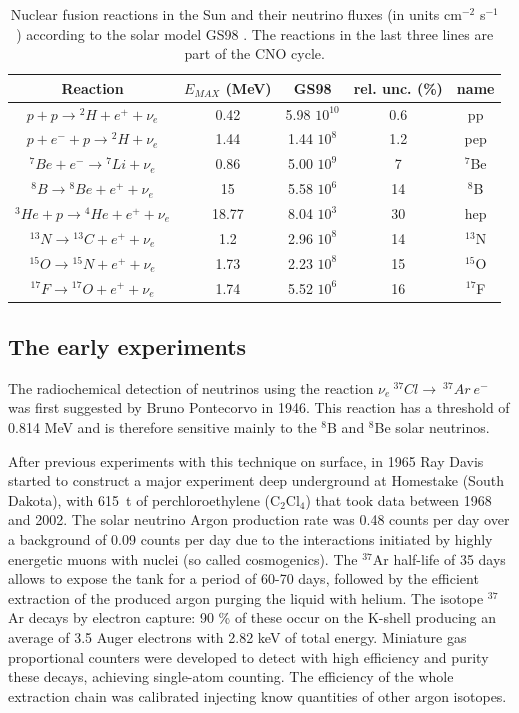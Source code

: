\begin{table}
\caption{Nuclear fusion reactions in the Sun and their neutrino fluxes (in units cm$^{-2}$ s$^{-1}$) according to the solar model GS98 \cite{serenelli}. The reactions in the last three lines are part of the CNO cycle.}
\centering
\begin{tabular}{|c|c|c|c|c|}
  \hline
  Reaction & $E_{MAX}$ (MeV) & GS98 & rel. unc. (\%) &name \\ 
  \hline
$ p + p \rightarrow {^2}H + e ^+ + \nu_e$ & 0.42 & 5.98    $10^{10}$ & 0.6 &pp \\
$ p + e^- + p \rightarrow {^2}H  + \nu_e$ & 1.44 & 1.44  $10^{8}$  & 1.2 &pep \\
$ {^7}Be + e^- \rightarrow {^7}Li + \nu_e$ & 0.86 & 5.00   $10^{9}$  & 7 &$ {^7}$Be \\
$ {^8}B \rightarrow {^8}Be + e ^+ + \nu_e$ & 15 & 5.58     $10^{6}$  & 14 &$ {^8}$B\\
$  {^3}He + p \rightarrow {^4}He + e ^+ + \nu_e$ & 18.77 & 8.04   $10^{3}$  & 30 &hep \\
$ {^{13}}N \rightarrow {^{13}}C + e ^+ + \nu_e$ & 1.2 & 2.96    $10^{8}$  &14  &$ {^{13}}$N\\
$ {^{15}}O \rightarrow {^{15}}N + e ^+ + \nu_e$ & 1.73 & 2.23     $10^{8}$  & 15& $ {^{15}}$O\\
$ {^{17}}F \rightarrow {^{17}}O + e ^+ + \nu_e$ & 1.74 & 5.52     $10^{6}$  & 16 &$ {^{17}}$F\\
  \hline
\end{tabular}
\label{tab:snuflux}
\end{table}


\subsection{The early experiments}

The radiochemical detection of neutrinos using the reaction 
$\nu_e~^{37}Cl\rightarrow~^{37}Ar~e^-$ was first suggested by Bruno Pontecorvo in 1946\cite{pontecorvo46}. This reaction has a threshold of 0.814 MeV and is therefore sensitive mainly to the $^8$B and $^8$Be solar neutrinos.

After previous experiments with this technique on surface, in 1965 Ray  Davis started  to construct a major experiment deep underground at Homestake (South Dakota), with 615~t of perchloroethylene (C$_2$Cl$_4$) that took data between 1968 and 2002.
The solar neutrino Argon production rate was 0.48 counts per day over a background of 0.09 counts per day due to the interactions initiated by highly energetic muons with nuclei (so called cosmogenics).
The $^{37}$Ar half-life of 35 days allows to expose the tank for a period of 60-70 days, followed by the efficient extraction of the produced argon purging the liquid with helium.  
The isotope $^{37}$Ar decays by electron capture: 90 \% of these occur on the K-shell producing an average of 3.5 Auger electrons with 2.82 keV of total energy. Miniature gas proportional counters were developed to detect with high efficiency and purity these decays, achieving single-atom counting.
The efficiency of the whole extraction chain was calibrated injecting know quantities of other argon isotopes.  

